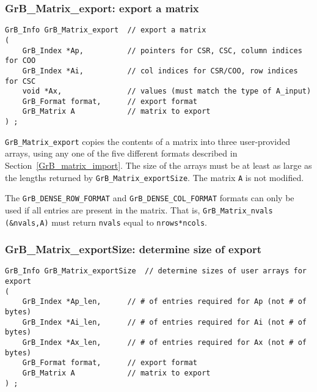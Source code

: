 \documentclass[12pt]{article}
\begin{document}
\subsubsection{{\sf GrB\_Matrix\_export:}  export a matrix}
\label{GrB_matrix_export}

\begin{mdframed}[userdefinedwidth=6in]
{\footnotesize
\begin{verbatim}
GrB_Info GrB_Matrix_export  // export a matrix
(
    GrB_Index *Ap,          // pointers for CSR, CSC, column indices for COO
    GrB_Index *Ai,          // col indices for CSR/COO, row indices for CSC
    void *Ax,               // values (must match the type of A_input)
    GrB_Format format,      // export format
    GrB_Matrix A            // matrix to export
) ;
\end{verbatim}
} \end{mdframed}

\verb'GrB_Matrix_export' copies the contents of a matrix into three
user-provided arrays, using any one of the five different formats
described in Section~\ref{GrB_matrix_import}.  The size of the arrays must be
at least as large as the lengths returned by \verb'GrB_Matrix_exportSize'.  The
matrix \verb'A' is not modified.

The \verb'GrB_DENSE_ROW_FORMAT' and \verb'GrB_DENSE_COL_FORMAT' formats can
only be used if all entries are present in the matrix.  That is,
\verb'GrB_Matrix_nvals (&nvals,A)' must return \verb'nvals' equal to
\verb'nrows*ncols'.

\subsubsection{{\sf GrB\_Matrix\_exportSize:} determine size of export}
\label{export_size}

\begin{mdframed}[userdefinedwidth=6in]
{\footnotesize
\begin{verbatim}
GrB_Info GrB_Matrix_exportSize  // determine sizes of user arrays for export
(
    GrB_Index *Ap_len,      // # of entries required for Ap (not # of bytes)
    GrB_Index *Ai_len,      // # of entries required for Ai (not # of bytes)
    GrB_Index *Ax_len,      // # of entries required for Ax (not # of bytes)
    GrB_Format format,      // export format
    GrB_Matrix A            // matrix to export
) ;
\end{verbatim}
} \end{mdframed}
\end{document}
